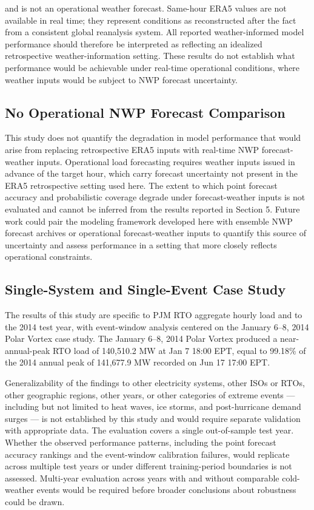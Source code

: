 \documentclass[12pt,a4paper]{article}
\begin{document}
 and is not an operational weather forecast. Same-hour ERA5 values are not available in real time; they represent conditions as reconstructed after the fact from a consistent global reanalysis system. All reported weather-informed model performance should therefore be interpreted as reflecting an idealized retrospective weather-information setting. These results do not establish what performance would be achievable under real-time operational conditions, where weather inputs would be subject to NWP forecast uncertainty.
\subsection{No Operational NWP Forecast Comparison}


This study does not quantify the degradation in model performance that would arise from replacing retrospective ERA5 inputs with real-time NWP forecast-weather inputs. Operational load forecasting requires weather inputs issued in advance of the target hour, which carry forecast uncertainty not present in the ERA5 retrospective setting used here. The extent to which point forecast accuracy and probabilistic coverage degrade under forecast-weather inputs is not evaluated and cannot be inferred from the results reported in Section 5. Future work could pair the modeling framework developed here with ensemble NWP forecast archives or operational forecast-weather inputs to quantify this source of uncertainty and assess performance in a setting that more closely reflects operational constraints.
\subsection{Single-System and Single-Event Case Study}
The results of this study are specific to PJM RTO aggregate hourly load and to the 2014 test year, with event-window analysis centered on the January 6–8, 2014 Polar Vortex case study. The January 6–8, 2014 Polar Vortex produced a near-annual-peak RTO load of 140,510.2 MW at Jan 7 18:00 EPT, equal to 99.18\% of the 2014 annual peak of 141,677.9 MW recorded on Jun 17 17:00 EPT. 

Generalizability of the findings to other electricity systems, other ISOs or RTOs, other geographic regions, other years, or other categories of extreme events --- including but not limited to heat waves, ice storms, and post-hurricane demand surges --- is not established by this study and would require separate validation with appropriate data.
The evaluation covers a single out-of-sample test year. Whether the observed performance patterns, including the point forecast accuracy rankings and the event-window calibration failures, would replicate across multiple test years or under different training-period boundaries is not assessed. Multi-year evaluation across years with and without comparable cold-weather events would be required before broader conclusions about robustness could be drawn.
\end{document}
